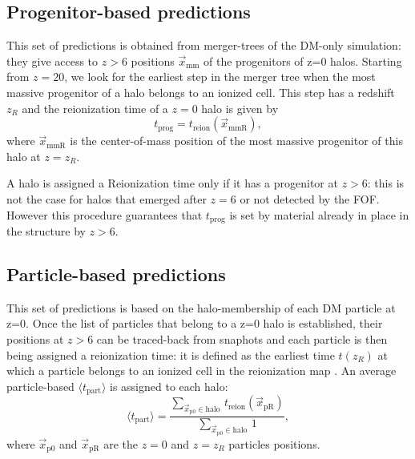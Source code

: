 \documentclass[twocolumn]{aastex61}
\begin{document}
\subsection{Progenitor-based predictions}
This set of predictions is obtained from merger-trees of the DM-only simulation: they give access to  $z>6$ positions $ \vec x_\mathrm{mm}$ of the progenitors of z=0 halos. Starting from $z=20$, we look for the earliest step in the merger tree when the most massive progenitor of a halo belongs to an ionized cell. This step has a redshift $z_R$ and the reionization time of a $z=0$ halo is given by
\begin{equation}
t_\mathrm{prog}=t_\mathrm{reion}(\vec x_\mathrm{mmR}),
\end{equation}
where $\vec x_\mathrm{mmR}$ is the center-of-mass position of the most massive progenitor of this halo at $z=z_R$.

A halo is assigned a Reionization time only if it has a progenitor at $z>6$: this is not the case for halos that emerged after $z=6$ or not detected by the FOF. %
However this procedure guarantees that $t_\mathrm{prog}$ is set by material already in place in the structure by $z>6$. 


\subsection{Particle-based predictions}
This set of predictions is based on the halo-membership of each DM particle at z=0. %
 Once the list of particles that belong to a z=0 halo is established, their positions at $z>6$ can be traced-back from snaphots and each particle is then being assigned a reionization time: it is defined as the earliest time $t(z_R)$ at which a particle belongs to an ionized cell in the reionization map . An average particle-based $\langle t_\mathrm{part} \rangle$  is assigned to each halo:
\begin{equation}
\langle t_\mathrm{part}\rangle=\frac{\sum_{\vec x_\mathrm{p0} \in \mathrm{halo} \ } t_\mathrm{reion}(\vec x_\mathrm{pR})}{\sum_{\vec x_\mathrm{p0} \in \mathrm{halo} \ } 1},
\end{equation}
where $\vec x_\mathrm{p0}$ and $\vec x_\mathrm{pR}$ are the $z=0$ and $z=z_R$ particles positions.
\end{document}
